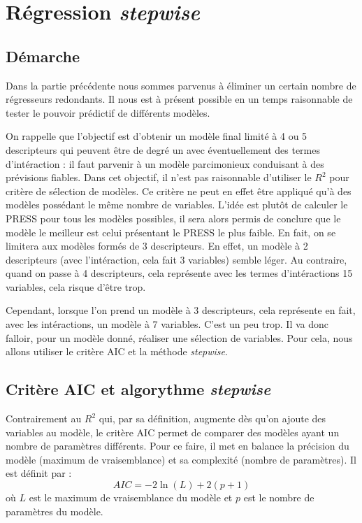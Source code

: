 
\chapter {Régression \emph{stepwise}}

\section{Démarche}

Dans la partie précédente nous sommes parvenus à éliminer un certain nombre de régresseurs redondants. Il nous est à présent possible en un temps raisonnable de tester le pouvoir prédictif de différents modèles. 

On rappelle que l'objectif est d'obtenir un modèle final limité à 4 ou 5 descripteurs qui peuvent être de degré un avec éventuellement des termes d'intéraction : il faut parvenir à un modèle parcimonieux conduisant à des prévisions fiables. 
Dans cet objectif, il n'est pas raisonnable d'utiliser le $R^2$ pour critère de sélection de modèles. Ce critère ne peut en effet être appliqué qu'à des modèles possédant le même nombre de variables.
L'idée est plutôt de calculer le PRESS pour tous les modèles possibles, il sera alors permis de conclure que le modèle le meilleur est celui présentant le PRESS le plus faible. En fait, on se limitera aux modèles formés de 3 descripteurs. En effet, un modèle à 2 descripteurs (avec l'intéraction, cela fait 3 variables) semble léger. Au contraire, quand on passe à 4 descripteurs, cela représente avec les termes d'intéractions 15 variables, cela risque d'être trop.

Cependant, lorsque l'on prend un modèle à 3 descripteurs, cela représente en fait, avec les intéractions, un modèle à 7 variables. C'est un peu trop. Il va donc falloir, pour un modèle donné, réaliser une sélection de variables. Pour cela, nous allons utiliser le critère AIC et la méthode \emph{stepwise}.

\section{Critère AIC et algorythme \emph{stepwise}}

Contrairement au $R^2$ qui, par sa définition, augmente dès qu'on ajoute des variables au modèle, le critère AIC permet de comparer des modèles ayant un nombre de paramètres différents. Pour ce faire, il met en balance la précision du modèle (maximum de vraisemblance) et sa complexité (nombre de paramètres). Il est définit par :
\[AIC = -2 \ln{(L)} + 2(p +1)\]
où $L$ est le maximum de vraisemblance du modèle et $p$ est le nombre de paramètres du modèle.

